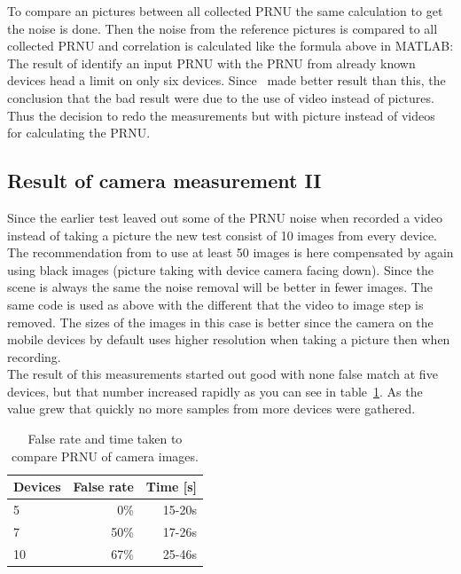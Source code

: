 To compare an pictures between all collected PRNU the same calculation to get the noise is done. Then the noise from the reference pictures is compared to all collected PRNU and correlation is calculated like the formula above in MATLAB:\\


The result of identify an input PRNU with the PRNU from already known devices head a limit on only six devices. Since~\cite{sensor:camera:DCIdent} made better result than this, the conclusion that the bad result were due to the use of video instead of pictures. Thus the decision to redo the measurements but with picture instead of videos for calculating the PRNU. 

\subsection{Result of camera measurement II}
Since the earlier test leaved out some of the PRNU noise when recorded a video instead of taking a picture the new test consist of 10 images from every device. The recommendation from \cite{sensor:camera:DCIdent} to use at least 50 images is here compensated by again using black images (picture taking with device camera facing down). Since the scene is always the same the noise removal will be better in fewer images. The same code is used as above with the different that the video to image step is removed. The sizes of the images in this case is better since the camera on the mobile devices by default uses higher resolution when taking a picture then when recording. \\
The result of this measurements started out good with none false match at five devices, but that number increased rapidly as you can see in table~\ref{tab:falseCam}. As the value grew that quickly no more samples from more devices were gathered.

\begin{table}[htbp]
  \centering
    \begin{tabular}{lrr}
    \toprule
    Devices & False rate & Time [s] \\
    \midrule
    5     & 0\%   & 15-20s \\
    7     & 50\%  & 17-26s \\
    10    & 67\%  & 25-46s \\
    \bottomrule
    \end{tabular}%
    \caption{False rate and time taken to compare PRNU of camera images.}
  \label{tab:falseCam}%
\end{table}%



